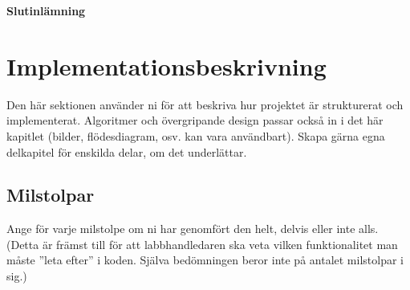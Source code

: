 \begin{center}
  \textbf{\Huge Slutinlämning}\\[1cm]
\end{center}
\section{Implementationsbeskrivning}
Den här sektionen använder ni för att beskriva hur projektet är strukturerat och implementerat. Algoritmer och övergripande design passar också in i det här kapitlet (bilder, flödesdiagram, osv. kan vara användbart). Skapa gärna egna delkapitel för enskilda delar, om det underlättar.\\ 
\subsection{Milstolpar}
Ange för varje milstolpe om ni har genomfört den helt, delvis eller inte alls.  (Detta är främst till för att labbhandledaren ska veta vilken funktionalitet man måste ”leta efter” i koden.  Själva bedömningen beror inte på antalet milstolpar i sig.)\\
